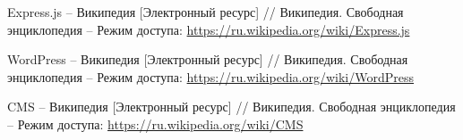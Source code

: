 \begin{thebibliography}{00}
        Express.js -- Википедия 
        [Электронный ресурс] //
        Википедия. Свободная энциклопедия
        --
        Режим доступа:
        \href{https://ru.wikipedia.org/wiki/Express.js}{https://ru.wikipedia.org/wiki/Express.js}
    
        WordPress -- Википедия 
        [Электронный ресурс] //
        Википедия. Свободная энциклопедия
        --
        Режим доступа:
        \href{https://ru.wikipedia.org/wiki/WordPress}{https://ru.wikipedia.org/wiki/WordPress}
        
        CMS -- Википедия 
        [Электронный ресурс] //
        Википедия. Свободная энциклопедия
        --
        Режим доступа:
        \href{https://ru.wikipedia.org/wiki/CMS}{https://ru.wikipedia.org/wiki/CMS}


\end{thebibliography}
\endgroup

\clearpage
